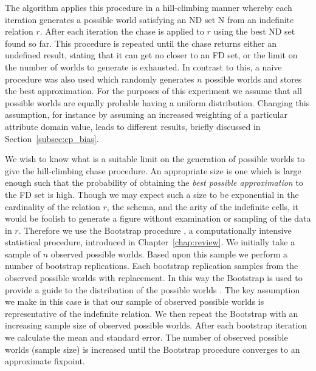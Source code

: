 The algorithm applies this procedure in a hill-climbing manner
whereby each iteration generates a possible world satisfying an ND set
N from an indefinite
relation $r$. 
After each iteration the chase is applied to $r$ using the best ND set
found so far. This procedure is repeated until 
the chase returns either an undefined result, stating that it can get no
closer to an FD set, or the limit on the number of worlds to
generate is exhausted.  In contrast to this, a naive procedure
was also used which randomly generates $n$ possible worlds and stores
the best approximation. 
For the purposes of this experiment we assume that all possible worlds
are equally probable having a uniform distribution. Changing this assumption,
for instance by assuming an increased weighting of a particular attribute 
domain value, leads to different results, briefly discussed in
Section~\ref{subsec:cp_bias}. 

\smallskip

We wish to know what is a suitable limit on the generation of possible 
worlds to give the hill-climbing
chase procedure. An appropriate size is one which is large enough such
that the probability of obtaining the {\em best possible approximation} to
the FD set is high. Though we may expect such a size to be exponential
in the cardinality of the relation $r$, the schema, and the arity of the indefinite cells,
it would be foolish to generate a figure without examination or
sampling of the data in $r$. Therefore we use the Bootstrap procedure
\cite{et86,et93}, a computationally intensive statistical procedure,
introduced in Chapter~\ref{chap:review}. We
initially take a sample of $n$ observed possible worlds. Based upon this sample
we perform a number of bootstrap replications. Each bootstrap
replication samples from the observed possible worlds with replacement.
In this way the Bootstrap is used to provide a guide to the 
distribution of the possible worlds \cite{dop94}. The key assumption
we make in this 
case is that our sample of observed possible worlds is representative
of the indefinite relation. We then repeat the Bootstrap with an increasing
sample size of observed possible 
worlds. After each bootstrap iteration we calculate the mean and 
standard error.  The number of observed possible worlds (sample size)
 is increased
until the Bootstrap procedure converges to an approximate fixpoint.

